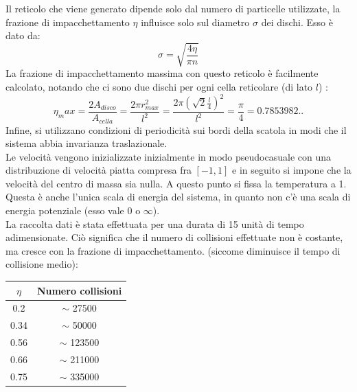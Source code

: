 Il reticolo che viene generato dipende solo dal numero di particelle utilizzate, la frazione di impacchettamento $\eta$ influisce solo sul diametro $\sigma$ dei dischi. Esso è dato da:
$$
	\sigma = \sqrt{\frac{4 \eta}{ \pi n}}
$$
La frazione di impacchettamento massima con questo reticolo è facilmente calcolato, notando che ci sono due dischi per ogni cella reticolare (di lato $l$) :
$$
	\eta_max = \frac{ 2 A_{disco}}{A_{cella}} = \frac{2 \pi r_{max}^2}{l^2} = \frac{2 \pi (\sqrt{2} \frac{l}{4})^2}{l^2} = \frac{\pi}{4} = 0.7853982..
$$
Infine, si utilizzano condizioni di periodicità sui bordi della scatola in modi che il sistema abbia invarianza traslazionale.\\
Le velocità vengono inizializzate inizialmente in modo pseudocasuale con una distribuzione di velocità piatta compresa fra $[-1,1]$ e in seguito si impone che la velocità del centro di massa sia nulla. 
A questo punto si fissa la temperatura a 1. Questa è anche l'unica scala di energia del sistema, in quanto non c'è una scala di energia potenziale (esso vale $0$ o $\infty$).\\
La raccolta dati è stata effettuata per una durata di 15 unità di tempo adimensionate. Ciò significa che il numero di collisioni effettuate non è costante, ma cresce con la frazione di impacchettamento. (siccome diminuisce il tempo di collisione medio):
\begin{center}

\begin{tabular}{c c}
\toprule
	$\eta$ & Numero collisioni \\
	\midrule
	0.2 & $\sim$ 27500 \\
	0.34 & $\sim$ 50000 \\
	0.56 & $\sim$ 123500 \\
	0.66 & $\sim$ 211000 \\
	0.75 & $\sim$ 335000 \\
	\bottomrule
\end{tabular}
\end{center}


